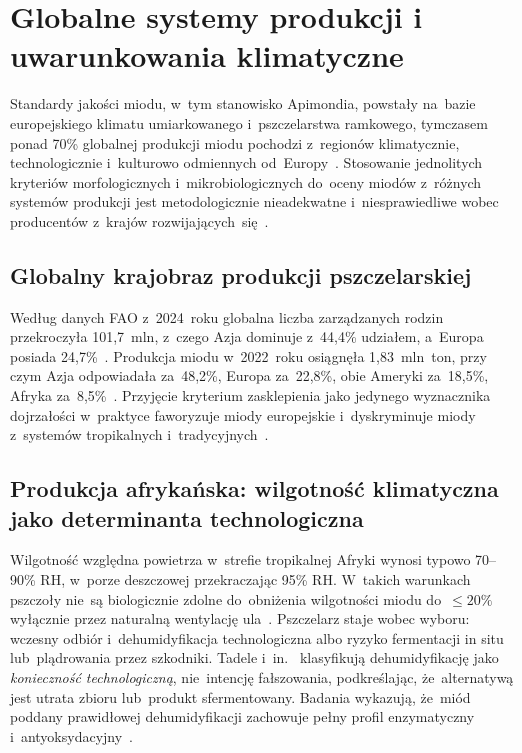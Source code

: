 \section{Globalne systemy produkcji i uwarunkowania klimatyczne}

Standardy jakości miodu, w~tym stanowisko Apimondia, powstały
na~bazie europejskiego klimatu umiarkowanego i~pszczelarstwa
ramkowego, tymczasem ponad 70\% globalnej produkcji miodu pochodzi
z~regionów klimatycznie, technologicznie i~kulturowo odmiennych
od~Europy~\cite{garcia2025,eudir2001110}. Stosowanie jednolitych
kryteriów morfologicznych i~mikrobiologicznych do~oceny miodów
z~różnych systemów produkcji jest metodologicznie nieadekwatne
i~niesprawiedliwe wobec producentów z~krajów
rozwijających~się~\cite{phiri2022,tadele2025}.

\subsection{Globalny krajobraz produkcji pszczelarskiej}

Według danych FAO z~2024~roku globalna liczba zarządzanych
rodzin przekroczyła 101,7~mln, z~czego Azja dominuje
z~44,4\% udziałem, a~Europa posiada 24,7\%~\cite{destatis2026}.
Produkcja miodu w~2022~roku osiągnęła 1,83~mln~ton, przy czym
Azja odpowiadała za~48,2\%, Europa za~22,8\%, obie Ameryki
za~18,5\%, Afryka za~8,5\%~\cite{phiri2022}. Przyjęcie
kryterium zasklepienia jako jedynego wyznacznika dojrzałości
w~praktyce faworyzuje miody europejskie i~dyskryminuje miody
z~systemów tropikalnych i~tradycyjnych~\cite{tadele2025,phiri2022}.

\subsection{Produkcja afrykańska: wilgotność klimatyczna jako determinanta technologiczna}

Wilgotność względna powietrza w~strefie tropikalnej Afryki wynosi
typowo 70--90\% RH, w~porze deszczowej przekraczając 95\% RH.
W~takich warunkach pszczoły nie~są biologicznie zdolne do~obniżenia
wilgotności miodu do~$\leq 20\%$ wyłącznie przez naturalną wentylację
ula~\cite{tadele2025}. Pszczelarz staje wobec wyboru: wczesny odbiór
i~dehumidyfikacja technologiczna albo ryzyko fermentacji in situ
lub~plądrowania przez szkodniki. Tadele i~in.~\cite{tadele2025}
klasyfikują dehumidyfikację jako \emph{konieczność technologiczną},
nie~intencję fałszowania, podkreślając, że~alternatywą jest utrata
zbioru lub~produkt sfermentowany. Badania wykazują, że~miód
poddany prawidłowej dehumidyfikacji zachowuje pełny profil
enzymatyczny i~antyoksydacyjny~\cite{lastriyanto2020,spel3upm}.

